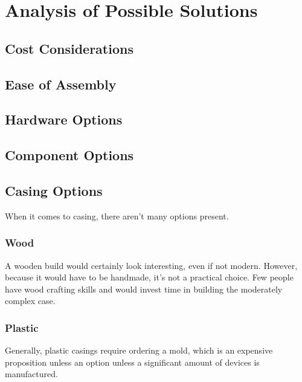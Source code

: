 \chapter{Analysis of Possible Solutions}
    \section{Cost Considerations}
        \blind[2]
    \section{Ease of Assembly}
        \blind[2]
    \section{Hardware Options}
        \blind[4]
    \section{Component Options}
    \section{Casing Options}
        When it comes to casing, there aren't many options present.
        \subsection{Wood}
            A wooden build would certainly look interesting, even if not modern.  However, because it would have to be handmade, it's not a practical choice.  Few people have wood crafting skills and would invest time in building the moderately complex case.
        \subsection{Plastic}
            Generally, plastic casings require ordering a mold, which is an expensive proposition unless an option unless a significant amount of devices is manufactured.
